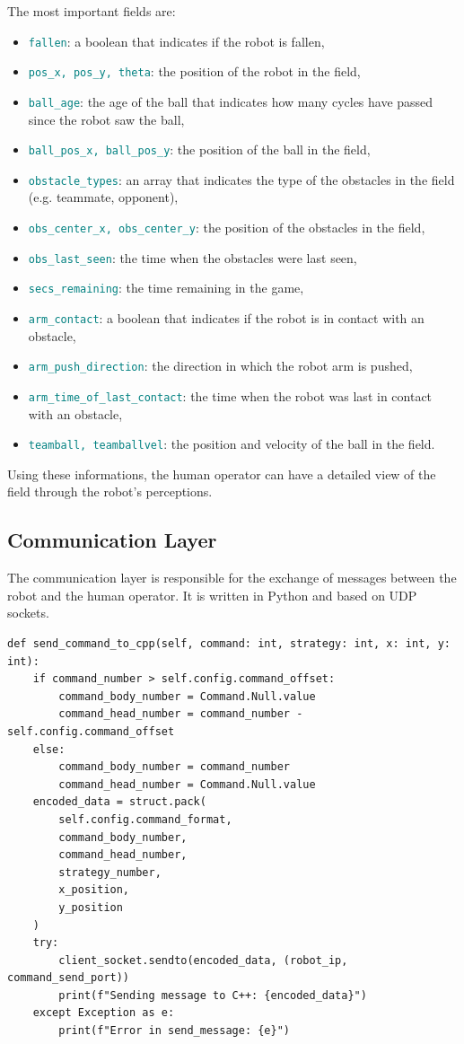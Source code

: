 \documentclass[a4paper, onecolumn, 12pt]{article}
\newcommand\code[1]{\textcolor{teal}{\texttt{#1}}}
\begin{document}
The most important fields are:
\begin{itemize}
    \item \code{fallen}: a boolean that indicates if the robot is fallen,
    \item \code{pos\_x, pos\_y, theta}: the position of the robot in the field,
    \item \code{ball\_age}: the age of the ball that indicates how many cycles have passed since the robot saw the ball,
    \item \code{ball\_pos\_x, ball\_pos\_y}: the position of the ball in the field,
    \item \code{obstacle\_types}: an array that indicates the type of the obstacles in the field (e.g. teammate, opponent),
    \item \code{obs\_center\_x, obs\_center\_y}: the position of the obstacles in the field,
    \item \code{obs\_last\_seen}: the time when the obstacles were last seen,
    \item \code{secs\_remaining}: the time remaining in the game,
    \item \code{arm\_contact}: a boolean that indicates if the robot is in contact with an obstacle,
    \item \code{arm\_push\_direction}: the direction in which the robot arm is pushed,
    \item \code{arm\_time\_of\_last\_contact}: the time when the robot was last in contact with an obstacle,
    \item \code{teamball, teamballvel}: the position and velocity of the ball in the field.
\end{itemize}
Using these informations, the human operator can have a detailed view of the field through the robot's perceptions.

\subsection{Communication Layer}

The communication layer is responsible for the exchange of messages between the
robot and the human operator. It is written in Python and based on UDP sockets. 

\begin{verbatim}
def send_command_to_cpp(self, command: int, strategy: int, x: int, y: int):
    if command_number > self.config.command_offset:
        command_body_number = Command.Null.value
        command_head_number = command_number - self.config.command_offset
    else:
        command_body_number = command_number
        command_head_number = Command.Null.value
    encoded_data = struct.pack(
        self.config.command_format,
        command_body_number,
        command_head_number,
        strategy_number,
        x_position,
        y_position
    )
    try:
        client_socket.sendto(encoded_data, (robot_ip, command_send_port))
        print(f"Sending message to C++: {encoded_data}")
    except Exception as e:
        print(f"Error in send_message: {e}")
\end{verbatim}
\end{document}
